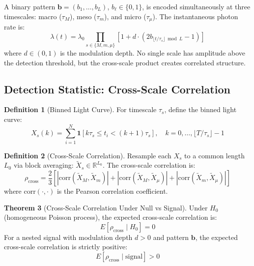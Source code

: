 \documentclass[11pt]{article}
\theoremstyle{definition}
\newtheorem{theorem}{Theorem}[section]
\newtheorem{definition}[theorem]{Definition}
\begin{document}
A binary pattern $\mathbf{b} = (b_1, \ldots, b_L)$, $b_\ell \in \{0, 1\}$, is encoded simultaneously at three timescales: macro ($\tau_M$), meso ($\tau_m$), and micro ($\tau_\mu$). The instantaneous photon rate is:
\begin{equation}
\lambda(t) = \lambda_0 \prod_{s \in \{M, m, \mu\}} \left[1 + d \cdot (2b_{\lfloor t/\tau_s \rfloor \bmod L} - 1)\right]
\end{equation}
where $d \in (0, 1)$ is the modulation depth. No single scale has amplitude above the detection threshold, but the cross-scale product creates correlated structure.

\subsection{Detection Statistic: Cross-Scale Correlation}

\begin{definition}[Binned Light Curve]
For timescale $\tau_s$, define the binned light curve:
\begin{equation}
X_s(k) = \sum_{i=1}^{N} \mathbf{1}\left[k\tau_s \le t_i < (k+1)\tau_s\right], \quad k = 0, \ldots, \lfloor T/\tau_s \rfloor - 1
\end{equation}
\end{definition}

\begin{definition}[Cross-Scale Correlation]
Resample each $X_s$ to a common length $L_0$ via block averaging: $\tilde{X}_s \in \mathbb{R}^{L_0}$. The cross-scale correlation is:
\begin{equation}
\rho_{\text{cross}} = \frac{2}{3} \left[ |\mathrm{corr}(\tilde{X}_M, \tilde{X}_m)| + |\mathrm{corr}(\tilde{X}_M, \tilde{X}_\mu)| + |\mathrm{corr}(\tilde{X}_m, \tilde{X}_\mu)| \right]
\end{equation}
where $\mathrm{corr}(\cdot, \cdot)$ is the Pearson correlation coefficient.
\end{definition}

\begin{theorem}[Cross-Scale Correlation Under Null vs Signal]
\label{thm:cross_scale}
Under $H_0$ (homogeneous Poisson process), the expected cross-scale correlation is:
\begin{equation}
E[\rho_{\text{cross}} \mid H_0] = 0
\end{equation}
For a nested signal with modulation depth $d > 0$ and pattern $\mathbf{b}$, the expected cross-scale correlation is strictly positive:
\begin{equation}
E[\rho_{\text{cross}} \mid \text{signal}] > 0
\end{equation}
\end{theorem}
\end{document}
